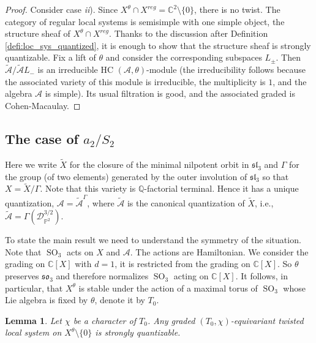 \documentclass[12pt]{amsart}
\newcommand{\C}{\mathbb{C}}
\newcommand{\A}{\mathcal{A}}
\newcommand{\HC}{\operatorname{HC}}
\newtheorem{Lem}[Thm]{Lemma}
\theoremstyle{definition}
\numberwithin{equation}{section}
\begin{document}
\begin{proof}
Consider case {\it ii}). Since $X^\theta\cap X^{reg}=\C^2\setminus \{0\}$, there is no twist.
The category of regular local systems is semisimple with one simple object, the structure
sheaf of $X^\theta\cap X^{reg}$. Thanks to the discussion after Definition \ref{defi:loc_sys_quantized}, it is enough to show that the structure sheaf is strongly quantizable.
Fix a lift of $\theta$ and consider the corresponding subspaces $L_\pm$.
Then $\tilde{\A}/\tilde{\A}L_-$ is an irreducible HC $(\A,\theta)$-module
(the irreducibility follows because the associated variety of this module is irreducible,
the multiplicity is $1$, and the algebra $\A$ is simple).
Its usual filtration is good, and the associated graded is Cohen-Macaulay.
\end{proof}

\subsection{The case of $a_2/S_2$}\label{SS_a2S_2}
Here we write $\tilde{X}$ for the closure of the  minimal nilpotent orbit in
$\mathfrak{sl}_3$ and $\Gamma$ for the group (of two elements) generated by the
outer involution of $\mathfrak{sl}_3$ so that $X=\tilde{X}/\Gamma$. Note
that this variety is $\mathbb{Q}$-factorial terminal. Hence it has a unique quantization, $\A=\tilde{\A}^\Gamma$, where
$\tilde{\A}$ is the canonical quantization of $\tilde{X}$, i.e.,
$\tilde{\A}=\Gamma(\mathscr{D}^{3/2}_{\mathbb{P}^2})$.

To state the main result we need to understand the symmetry of the situation. Note that $\operatorname{SO}_3$ acts on $X$ and $\A$. The actions are Hamiltonian. We consider the grading
on $\C[X]$ with $d=1$, it is restricted from the grading on $\C[X]$.  So $\theta$ preserves $\mathfrak{so}_3$ and therefore normalizes $\operatorname{SO}_3$
acting on $\C[X]$. It follows, in particular, that $X^\theta$ is stable under the action of a maximal
torus of $\operatorname{SO}_3$ whose Lie algebra is fixed by $\theta$, denote it by $T_0$.

\begin{Lem}\label{Lem:a2S2_strongly_quantizable}%
Let $\chi$ be a character of $T_0$.
Any graded $(T_0,\chi)$-equivariant twisted local system on $X^\theta\setminus \{0\}$
is strongly quantizable.
\end{Lem}
\end{document}
